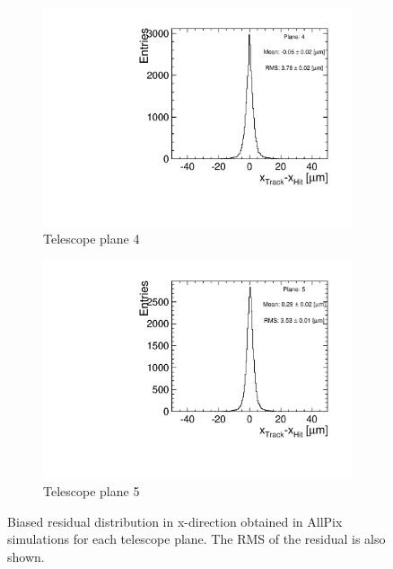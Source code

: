 \begin{figure}[htbp]
\begin{subfigure}[b]{0.3\textwidth}
    \includegraphics[width=\textwidth]{figures/Telescope/biasedResiduals/BiasedResiduals_run77_PlaneXRMS4.pdf}
    \caption{Telescope plane 4}
  \end{subfigure}\hfill
  \begin{subfigure}[b]{0.3\textwidth}
    \includegraphics[width=\textwidth]{figures/Telescope/biasedResiduals/BiasedResiduals_run77_PlaneXRMS5.pdf}
    \caption{Telescope plane 5}
  \end{subfigure}
  \caption{Biased residual distribution in x-direction obtained in
    AllPix simulations for each telescope plane. The RMS of the
    residual is also shown.}
  \label{fig:telescope_biasedResiduals_simu_X}
\end{figure}


